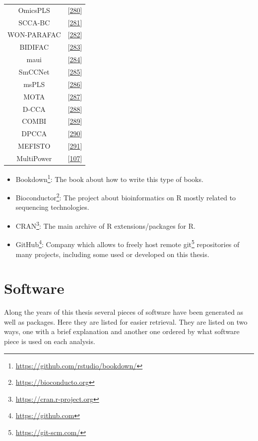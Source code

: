 \documentclass[
  a4paper,
]{book}
\DeclareRobustCommand{\href}[2]{#2\footnote{\url{#1}}}
\begin{document}
\begin{longtable}[]{@{}cc@{}}
OmicsPLS & {[}\protect\hyperlink{ref-bouhaddani2018}{280}{]} \\
SCCA-BC & {[}\protect\hyperlink{ref-pimentel2018}{281}{]} \\
WON-PARAFAC & {[}\protect\hyperlink{ref-kim2019}{282}{]} \\
BIDIFAC & {[}\protect\hyperlink{ref-lock2020}{283}{]} \\
maui & {[}\protect\hyperlink{ref-ronen2019}{284}{]} \\
SmCCNet & {[}\protect\hyperlink{ref-shi2019}{285}{]} \\
msPLS & {[}\protect\hyperlink{ref-csala2020}{286}{]} \\
MOTA & {[}\protect\hyperlink{ref-fan2020}{287}{]} \\
D-CCA & {[}\protect\hyperlink{ref-shu2020}{288}{]} \\
COMBI & {[}\protect\hyperlink{ref-hawinkel2020}{289}{]} \\
DPCCA & {[}\protect\hyperlink{ref-gundersen2020}{290}{]} \\
MEFISTO & {[}\protect\hyperlink{ref-velten2020}{291}{]} \\
MultiPower & {[}\protect\hyperlink{ref-tarazona2020}{107}{]} \\
\bottomrule
\end{longtable}

\begin{itemize}
\item
  \href{https://github.com/rstudio/bookdown/}{Bookdown}: The book about how to write this type of books.
\item
  \href{https://bioconducto.org}{Bioconductor}: The project about bioinformatics on R mostly related to sequencing technologies.
\item
  \href{https://cran.r-project.org}{CRAN}: The main archive of R extensions/packages for R.
\item
  \href{https://github.com}{GitHub}: Company which allows to freely host remote \href{https://git-scm.com/}{git} repositories of many projects, including some used or developed on this thesis.
\end{itemize}

\hypertarget{software}{%
\chapter{Software}\label{software}}

Along the years of this thesis several pieces of software have been generated as well as packages.
Here they are listed for easier retrieval.
They are listed on two ways, one with a brief explanation and another one ordered by what software piece is used on each analysis.
\end{document}
